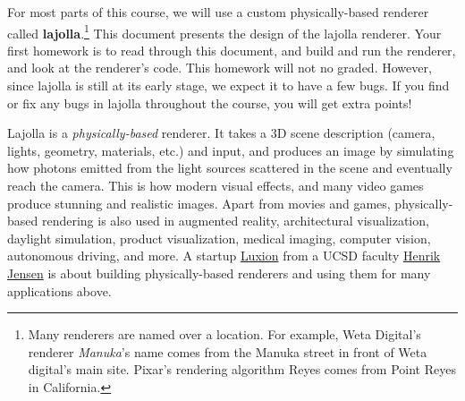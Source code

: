 




For most parts of this course, we will use a custom physically-based renderer called \textbf{lajolla}.\footnote{Many renderers are named over a location. For example, Weta Digital's renderer \emph{Manuka}'s name comes from the Manuka street in front of Weta digital's main site. Pixar's rendering algorithm Reyes comes from Point Reyes in California.} This document presents the design of the lajolla renderer. Your first homework is to read through this document, and build and run the renderer, and look at the renderer's code. This homework will not no graded. However, since lajolla is still at its early stage, we expect it to have a few bugs. If you find or fix any bugs in lajolla throughout the course, you will get extra points!

Lajolla is a \emph{physically-based} renderer. It takes a 3D scene description (camera, lights, geometry, materials, etc.) and input, and produces an image by simulating how photons emitted from the light sources scattered in the scene and eventually reach the camera. This is how modern visual effects, and many video games produce stunning and realistic images. Apart from movies and games, physically-based rendering is also used in augmented reality, architectural visualization, daylight simulation, product visualization, medical imaging, computer vision, autonomous driving, and more. A startup \href{https://www.luxion.com/}{Luxion} from a UCSD faculty \href{http://graphics.ucsd.edu/~henrik/}{Henrik Jensen} is about building physically-based renderers and using them for many applications above.

